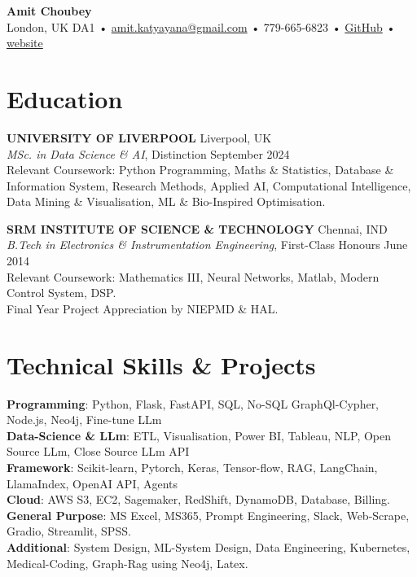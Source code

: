 \documentclass[a4paper,9pt]{article} %
\begin{document}
\begin{center}
    {\LARGE \textbf{Amit Choubey}} \\
    London, UK  DA1 • \href{mailto:amit.katyayana@gmail.com}{amit.katyayana@gmail.com} • 779-665-6823 • \href{https://github.com/amit-chaubey}{GitHub} • \href{https://www.amitkatyayana.com}{website}
\end{center}

\vspace{0.1cm} %

\section*{Education}

\textbf{UNIVERSITY OF LIVERPOOL} \hfill Liverpool, UK \\
\textit{MSc. in Data Science \& AI}, Distinction \hfill September 2024 \\
Relevant Coursework: Python Programming, Maths \& Statistics, Database \& Information System, Research Methods, Applied AI, Computational Intelligence, Data Mining \& Visualisation, ML \& Bio-Inspired Optimisation.\\

\vspace{0.1cm} %

\textbf{SRM INSTITUTE OF SCIENCE \& TECHNOLOGY} \hfill Chennai, IND \\
\textit{B.Tech in Electronics \& Instrumentation Engineering}, First-Class Honours \hfill June 2014 \\
Relevant Coursework:  Mathematics III, Neural Networks, Matlab, Modern Control System, DSP. \\
Final Year Project Appreciation by NIEPMD \& HAL.

\section*{Technical Skills \& Projects}

\textbf{Programming}: Python, Flask, FastAPI, SQL, No-SQL GraphQl-Cypher, Node.js, Neo4j, Fine-tune LLm\\
\textbf{Data-Science \& LLm}: ETL, Visualisation, Power BI, Tableau, NLP, Open Source LLm, Close Source LLm API\\ 
\textbf{Framework}: Scikit-learn, Pytorch, Keras, Tensor-flow, RAG, LangChain, LlamaIndex, OpenAI API, Agents\\
\textbf{Cloud}: AWS S3, EC2, Sagemaker, RedShift, DynamoDB, Database, Billing.\\
\textbf{General Purpose}: MS Excel, MS365, Prompt Engineering, Slack, Web-Scrape, Gradio, Streamlit, SPSS.\\
\textbf{Additional}: System Design, ML-System Design, Data Engineering, Kubernetes, Medical-Coding, Graph-Rag using Neo4j, Latex.
\vspace{0.2cm}
\end{document}
